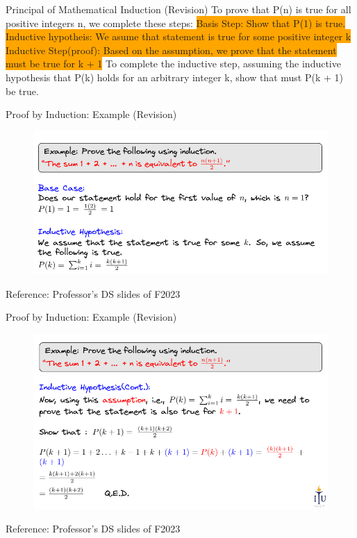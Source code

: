 \begin{frame}{Principal of Mathematical Induction (Revision)}
    \large
    To prove that P(n) is true for all positive integers n, we complete
    these steps:
    \small
    \colorbox{orange}{Basis Step: Show that P(1) is true.}\\
    \colorbox{orange}{Inductive hypotheis: We asume that statement is true for some positive integer k}\\
    
    \colorbox{orange}{Inductive Step(proof): Based on the assumption, we prove that the
    statement must be true for k + 1}
    \large
    To complete the inductive step, assuming the inductive hypothesis
    that P(k) holds for an arbitrary integer k, show that must P(k + 1)
    be true.
\end{frame}

\begin{frame}{Proof by Induction: Example (Revision)}
    \begin{figure}
        
        \includegraphics[width=0.9\linewidth]{Selection_844.png}
        \label{fig:enter-label}
    \end{figure}
    \small
    Reference: Professor's DS slides of F2023
\end{frame}

\begin{frame}{Proof by Induction: Example (Revision)}
    \begin{figure}
        \centering
        \includegraphics[width=0.9\linewidth]{image2.png}
        \label{fig:enter-label}
    \end{figure}
    \small
    Reference: Professor's DS slides of F2023
\end{frame}

